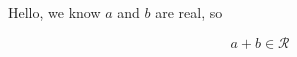 \documentclass{article}
\begin{document}
Hello, we know $a$ and $b$ are real, so

\[ a + b \in \mathcal{R} \]
\end{document}
